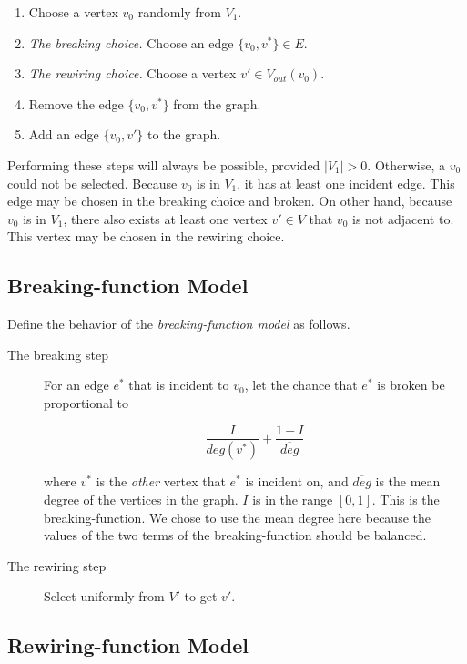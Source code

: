 \documentclass[a4paper,10pt]{article}
\begin{document}
\begin{enumerate}
 \item Choose a vertex $v_0$ randomly from $V_1$. 
 \item \emph{The breaking choice.} Choose an edge $\{v_0, v^*\} \in E$. 
 \item \emph{The rewiring choice.} Choose a vertex $v' \in V_{out}(v_0)$.
 \item Remove the edge $\{v_0, v^*\}$ from the graph.
 \item Add an edge $\{v_0, v'\}$ to the graph.

\end{enumerate}

Performing these steps will always be possible, provided $|V_1| > 0$. Otherwise, a $v_0$ could not be selected. Because $v_0$ is in $V_1$, it has at least one incident edge. This edge may be chosen in the breaking choice and broken. On other hand, because $v_0$ is in $V_1$, there also exists at least one vertex $v' \in V$ that $v_0$ is not adjacent to. This vertex may be chosen in the rewiring choice. 

\subsection{Breaking-function Model}

Define the behavior of the \emph{breaking-function model} as follows.

\begin{description}
 \item[The breaking step]

 For an edge $e^*$ that is incident to $v_0$, let the chance that $e^*$ is broken be proportional to

 \begin{equation}
\label{eqn:breaking-function}
  \frac{I}{deg(v^*)} + \frac{1 - I}{\overline{deg}}
 \end{equation}

where $v^*$ is the \emph{other} vertex that $e^*$ is incident on, and $\overline{deg}$ is the mean degree of the vertices in the graph. $I$ is in the range $[0, 1]$. This is the breaking-function. We chose to use the mean degree here because the values of the two terms of the breaking-function should be balanced. 

 \item[The rewiring step] Select uniformly from $V'$ to get $v'$.
\end{description}

\subsection{Rewiring-function Model}
\end{document}
